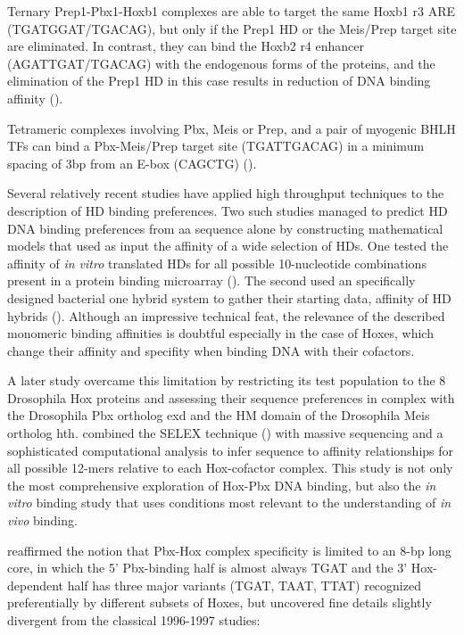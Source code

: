 Ternary Prep1-Pbx1-Hoxb1 complexes are able to target the same Hoxb1 r3 \ac{ARE} (TGATGGAT/TGACAG), but only if the Prep1 \ac{HD} or the Meis/Prep target site are eliminated. In contrast, they can bind the Hoxb2 r4 enhancer (AGATTGAT/TGACAG) with the endogenous forms of the proteins, and the elimination of the Prep1 \ac{HD} in this case results in reduction of DNA binding affinity (\cite{Ferretti2000}).

Tetrameric complexes involving Pbx, Meis or Prep, and a pair of myogenic \ac{BHLH} \acp{TF} can bind a Pbx-Meis/Prep target site (TGATTGACAG) in a minimum spacing of 3bp from an E-box (CAGCTG) (\cite{Knoepfler1999}).
	
Several relatively recent studies have applied high throughput techniques to the description of \ac{HD} binding preferences. Two such studies managed to predict \ac{HD} DNA binding preferences from \ac{aa} sequence alone by constructing mathematical models that used as input the affinity of a wide selection of \acp{HD}. One tested the affinity of \textit{in vitro} translated \acp{HD} for all possible 10-nucleotide combinations present in a protein binding microarray (\cite{Berger2008}). The second used an specifically designed bacterial one hybrid system to gather their starting data, affinity of \ac{HD} hybrids (\cite{Noyes2008}). Although an impressive technical feat, the relevance of the described monomeric binding affinities is doubtful especially in the case of Hoxes, which change their affinity and specifity when binding DNA with their cofactors. 

A later study overcame this limitation by restricting its test population to the 8 Drosophila Hox proteins and assessing their sequence preferences in complex with the Drosophila Pbx ortholog \ac{exd} and the HM domain of the Drosophila Meis ortholog \ac{hth}. \textcite{Slattery2011} combined the SELEX technique (\cite{Tuerk1990}) with massive sequencing and a sophisticated computational analysis to infer sequence to affinity relationships for all possible 12-mers relative to each Hox-cofactor complex. This study is not only the most comprehensive exploration of Hox-Pbx DNA binding, but also the \textit{in vitro} binding study that uses conditions most relevant to the understanding of \textit{in vivo} binding. 

\textcite{Slattery2011} reaffirmed the notion that Pbx-Hox complex specificity is limited to an 8-bp long core, in which the 5' Pbx-binding half is almost always TGAT and the 3' Hox-dependent half has three major variants (TGAT, TAAT, TTAT) recognized preferentially by different subsets of Hoxes, but uncovered fine details slightly divergent from the classical 1996-1997 studies:

